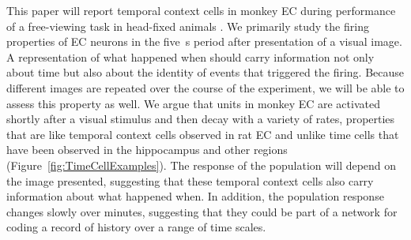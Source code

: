 \documentclass{apa}
\begin{document}
This paper will report temporal context cells in monkey EC during performance
of a free-viewing task in head-fixed animals  \cite{MeisBuff18}.   We
primarily study the firing properties of EC neurons in the five~s period after
presentation of a visual image.  A representation of what happened when should
carry information  not only about  time but also about the identity of events
that triggered the firing.  Because different images are repeated over the
course of the experiment, we will be able to assess this property as well.  We
argue that units in monkey EC are activated shortly after a visual stimulus
and then decay with a variety of rates, properties that are like temporal
context cells observed in rat EC \cite{TsaoEtal18} and unlike time cells that
have been observed in the hippocampus and other regions
(Figure~\ref{fig:TimeCellExamples}).  The response of the population will
depend on the image presented, suggesting that these temporal context cells
also carry information about what happened when.  In addition, the population
response changes slowly  over minutes, suggesting that they could be part of a
network for coding a record of history over a range of time scales.
\end{document}
